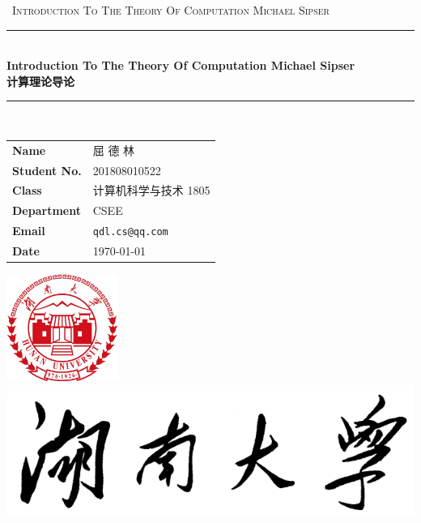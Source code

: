 \documentclass{hnureport}
\begin{document}
\begin{titlepage}
    \clearpage\thispagestyle{empty}
    \centering
    \vspace{1cm}
    {\
        \textsc{Introduction To The Theory Of Computation Michael Sipser}
    }
    \vspace{2.5cm}
    
    \rule{\linewidth}{2mm} \\[0.5cm]
    { \Huge \bfseries Introduction To The Theory Of Computation Michael Sipser\\[0.2em]
        计算理论导论}\\[0.5cm]
    \rule{\linewidth}{0.6mm} \\[1.5cm]
    
    \hspace{2cm}
    \begin{tabular}{l p{5cm}}
        \textbf{Name} & 屈 德 林 \\[10pt]
        \textbf{Student No.} & 201808010522 \\[10pt]
        \textbf{Class} & 计算机科学与技术 1805 \\[10pt]
        \textbf{Department} & CSEE \\[10pt]
        \textbf{Email} & \texttt{qdl.cs@qq.com} \\[10pt]
        \textbf{Date} & \today \\            
    \end{tabular}
    
    \vfill
    \centering \includegraphics[height=3.5cm]{Figure/bit_logo.png}\\ %
    \centering \includegraphics[scale=0.3]{Figure/logo_slogan.png}
    \vspace{0.5cm}

    \pagebreak
\end{titlepage}
    
\thispagestyle{empty}
\tableofcontents
\newpage 
\setcounter{page}{1}









\appendix


\end{document}

